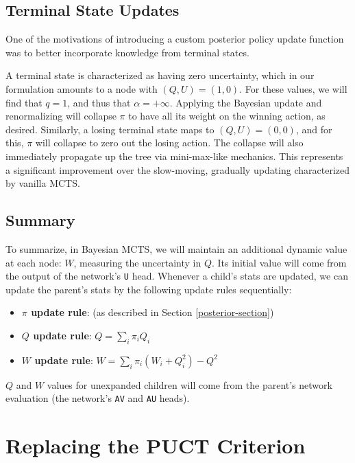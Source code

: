 \documentclass[tikz]{article}
\begin{document}
\subsection{Terminal State Updates}

One of the motivations of introducing a custom posterior policy update function was to better incorporate knowledge from terminal states. \newline

A terminal state is characterized as having zero uncertainty, which in our formulation amounts to a node with $(Q, U) = (1, 0)$. For
these values, we will find that $q=1$, and thus that $\alpha = +\infty$. Applying the Bayesian update and
renormalizing will collapse $\pi$ to have all its weight on the winning action, as desired. Similarly, a losing terminal state maps
to $(Q, U) = (0, 0)$, and for this, $\pi$ will collapse to zero out the losing action. The collapse will also immediately propagate up the tree via
mini-max-like mechanics. This represents a significant improvement over the slow-moving, gradually updating characterized by vanilla MCTS. \newline

\subsection{Summary}

To summarize, in Bayesian MCTS, we will maintain an additional dynamic value at each node: $W$, measuring the uncertainty in $Q$.
Its initial value will come from the output of the network's \texttt{U} head.
Whenever a child's stats are updated, we can update the parent's stats by the following update rules sequentially:

\begin{itemize}
    \item \textbf{$\pi$ update rule}: (as described in Section \ref{posterior-section})
    \item \textbf{$Q$ update rule}: $Q = \sum_i \pi_i Q_i$
    \item \textbf{$W$ update rule}: $W = \sum_i \pi_i(W_i+Q_i^2) - Q^2$
\end{itemize}

$Q$ and $W$ values for unexpanded children will come from the parent's network evaluation (the network's \texttt{AV} and \texttt{AU} heads).

\newpage 

\section{Replacing the PUCT Criterion}
\end{document}
